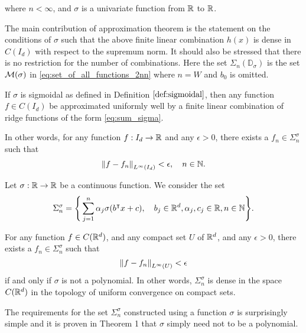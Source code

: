 where  $n < \infty$, and $\sigma$ is a univariate function from $\mathbb{R}$ to $\mathbb{R}$.
 
The main contribution of approximation theorem is the statement on the
conditions of $\sigma$ such that the above finite linear combination $h(x)$ is
dense in $C(I_d)$ with respect to the supremum norm. It should also be stressed
that there is no restriction for the number of combinations. Here the set
$\Sigma_n(\mathbb{D}_{\sigma})$ is the set $\mathcal{M}(\sigma)$ in
\eqref{eq:set_of_all_functions_2nn} where $n = W$ and $b_0$ is omitted.

\begin{theorem}
    \label{thm:uat}
    If $\sigma$ is sigmoidal as defined in Definition $\ref{def:sigmoidal}$,
    then any function $f \in C(I_d)$ be approximated uniformly well by a finite
    linear combination of ridge functions of the form \eqref{eq:sum_sigma}.

    In other words, for any function $f: I_d \to \mathbb{R}$ and any $\epsilon > 0$,
    there exists a $f_n \in \Sigma_n^{\sigma}$ such that
    \begin{align}
        \left\| f - f_n \right\|_{L^{\infty}(I_d)} < \epsilon, \quad n \in \mathbb{N}.
    \end{align}
\end{theorem}

\begin{theorem}
    Let $\sigma: \mathbb{R} \to \mathbb{R}$ be a continuous function. We consider the set
    \begin{equation}
        \Sigma_n^{\sigma} = \Bigg\{
            \sum_{j=1}^n \alpha_j \sigma(b{}^{\intercal} x + c), \quad
            b_j \in \mathbb{R}^d, \alpha_j, c_j \in \mathbb{R}, n\in\mathbb{N}
        \Bigg\}.
    \end{equation}

    For any function $f \in C(\mathbb{R}^d)$, and any compact set $U$ of $\mathbb{R}^d$, and any
    $\epsilon > 0$, there exists a $f_n \in \Sigma_n^{\sigma}$ such that 
    \begin{equation}
        \left\| f - f_n \right\|_{L^{\infty}(U)} < \epsilon
    \end{equation}
    if and only if $\sigma$ is not a polynomial. In other words,
    $\Sigma_n^{\sigma}$ is dense in the space $C(\mathbb{R}^d)$ in the topology of
    uniform convergence on compact sets.
\end{theorem}

\begin{remark}
    The requirements for the set $\Sigma_n^{\sigma}$ constructed using a
    function $\sigma$ is surprisingly simple and it is proven in Theorem 1
    \cite[p. 10]{leshnoMultilayerFeedforwardNetworks1993} that $\sigma$ simply
    need not to be a polynomial.
\end{remark}

